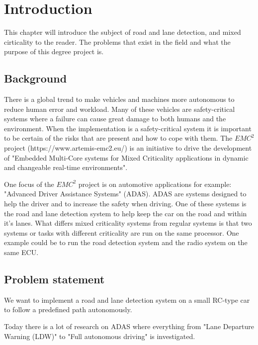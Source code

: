 \chapter{Introduction}
\label{sec:introduction}
This chapter will introduce the subject of road and lane detection, and mixed cirticality to the reader. The problems that exist in the field and what the purpose of this degree project is.


\section{Background}
There is a global trend to make vehicles and machines more autonomous to reduce human error and workload. Many of these vehicles are safety-critical systems where a failure can cause great damage to both humans and the environment. When the implementation is a safety-critical system it is important to be certain of the risks that are present and how to cope with them. The $EMC^2$ project (https://www.artemis-emc2.eu/) is an initiative to drive the development of "Embedded Multi-Core systems for Mixed Criticality applications in dynamic and changeable real-time environments". 




One focus of the $EMC^2$ project is on automotive applications for example: "Advanced Driver Assistance Systems" (ADAS). ADAS are systems designed to help the driver and to increase the safety when driving. One of these systems is the road and lane detection system to help keep the car on the road and within it's lanes. What differs mixed criticality systems from regular systems is that two systems or tasks with different criticality are run on the same processor. One example could be to run the road detection system and the radio system on the same ECU. 


\section{Problem statement}
We want to implement a road and lane detection system on a small RC-type car to follow a predefined path autonomously. 

Today there is a lot of research on ADAS where everything from "Lane Departure Warning (LDW)" to "Full autonomous driving" is investigated. 

